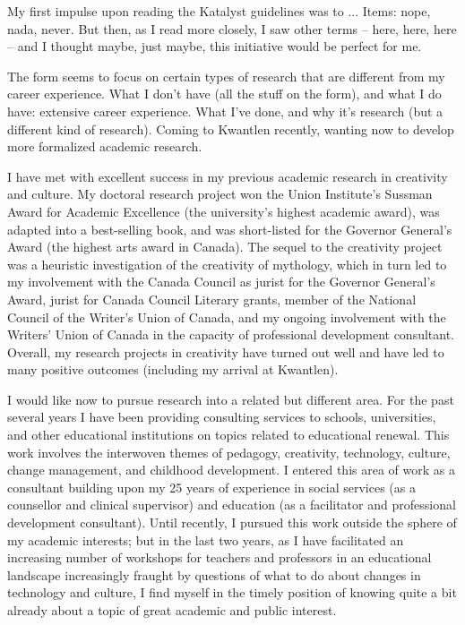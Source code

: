 My first impulse upon reading the Katalyst guidelines was to ...
Items: nope, nada, never.
But then, as I read more closely, I saw other terms -- here, here, here -- and I thought maybe, just maybe, this initiative would be perfect for me.


The form seems to focus on certain types of research that are different from my career experience.
What I don't have (all the stuff on the form), and what I do have: extensive career experience.
What I've done, and why it's research (but a different kind of research).
Coming to Kwantlen recently, wanting now to develop more formalized academic research.


I have met with excellent success in my previous academic research in creativity and culture. My doctoral research project won the Union Institute's Sussman Award for Academic Excellence (the university's highest academic award), was adapted into a best-selling book, and was short-listed for the Governor General's Award (the highest arts award in Canada). The sequel to the creativity project was a heuristic investigation of the creativity of mythology, which in turn led to my involvement with the Canada Council as jurist for the Governor General's Award, jurist for Canada Council Literary grants, member of the National Council of the Writer's Union of Canada, and my ongoing involvement with the Writers' Union of Canada in the capacity of professional development consultant. Overall, my research projects in creativity have turned out well and have led to many positive outcomes (including my arrival at Kwantlen).

I would like now to pursue research into a related but different area. For the past several years I have been providing consulting services to schools, universities, and other educational institutions on topics related to educational renewal. This work involves the interwoven themes of pedagogy, creativity, technology, culture, change management, and childhood development. I entered this area of work as a consultant building upon my 25 years of experience in social services (as a counsellor and clinical supervisor) and education (as a facilitator and professional development consultant). Until recently, I pursued this work outside the sphere of my academic interests; but in the last two years, as I have facilitated an increasing number of workshops for teachers and professors in an educational landscape increasingly fraught by questions of what to do about changes in technology and culture, I find myself in the timely position of knowing quite a bit already about a topic of great academic and public interest.


